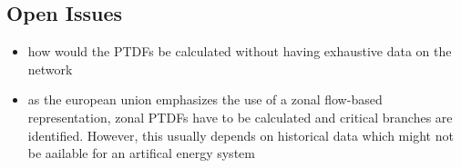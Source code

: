 \subsection{Open Issues}
\begin{itemize}
	\item how would the PTDFs be calculated without having exhaustive data on the network
	\item as the european union emphasizes the use of a zonal flow-based representation, zonal PTDFs have to be calculated and critical branches are identified. However, this usually depends on historical data which might not be aailable for an artifical energy system
\end{itemize}
% 		
%
